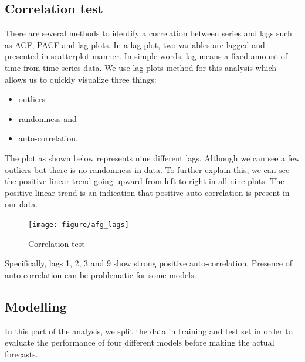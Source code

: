 \documentclass[11pt,oneside,a4paper]{reedthesis}
\providecommand{\tightlist}{%
  \setlength{\itemsep}{0pt}\setlength{\parskip}{0pt}}
\begin{document}
\subsection{Correlation test}\label{correlation-test-1}

There are several methods to identify a correlation between series and
lags such as ACF, PACF and lag plots. In a lag plot, two variables are
lagged and presented in scatterplot manner. In simple words, lag means a
fixed amount of time from time-series data. We use lag plots method for
this analysis which allows us to quickly visualize three things:
\begin{itemize}
\tightlist
\item
  outliers
\item
  randomness and
\item
  auto-correlation.
\end{itemize}
The plot as shown below represents nine different lags. Although we can
see a few outliers but there is no randomness in data. To further
explain this, we can see the positive linear trend going upward from
left to right in all nine plots. The positive linear trend is an
indication that positive auto-correlation is present in our data.
\begin{figure}
\texttt{[image: figure/afg\_lags]} \caption{Correlation test}\label{fig:unnamed-chunk-59}
\end{figure}
Specifically, lags 1, 2, 3 and 9 show strong positive auto-correlation.
Presence of auto-correlation can be problematic for some models.

\subsection{Modelling}\label{modelling}

In this part of the analysis, we split the data in training and test set
in order to evaluate the performance of four different models before
making the actual forecasts.
\end{document}
